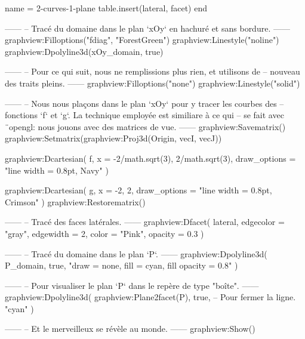 \documentclass{standalone}
\begin{document}
\begin{luadraw}{name = 2-curves-1-plane}
  table.insert(lateral, facet)
end

------
-- Tracé du domaine dans le plan `xOy` en hachuré et sans bordure.
------
graphview:Filloptions("fdiag", "ForestGreen")
graphview:Linestyle("noline")
graphview:Dpolyline3d(xOy_domain, true)

------
-- Pour ce qui suit, nous ne remplissions plus rien, et utilisons de
-- nouveau des traits pleins.
------
graphview:Filloptions("none")
graphview:Linestyle("solid")

------
-- Nous nous plaçons dans le plan `xOy` pour y tracer les courbes des
-- fonctions  `f` et `g`. La technique employée est similiare à ce qui
-- se fait avec ¨opengl: nous jouons avec des matrices de vue.
------
graphview:Savematrix()
  graphview:Setmatrix(graphview:Proj3d({Origin, vecI, vecJ}))

  graphview:Dcartesian(
    f,
    {
      x = {-2/math.sqrt(3), 2/math.sqrt(3)},
      draw_options = "line width = 0.8pt, Navy"
    })

  graphview:Dcartesian(
    g,
    {
      x = {-2, 2},
      draw_options = "line width = 0.8pt, Crimson"
    })
graphview:Restorematrix()

------
-- Tracé des faces latérales.
------
graphview:Dfacet(
  lateral,
  {
    edgecolor = "gray",
    edgewidth = 2,
    color   = "Pink",
    opacity   = 0.3
  })

------
-- Tracé du domaine dans le plan `P`.
------
graphview:Dpolyline3d(
  P_domain,
  true,
  "draw = none, fill = cyan, fill opacity = 0.8"
)

------
-- Pour visualiser le plan `P` dans le repère de type "boîte".
------
graphview:Dpolyline3d(
  graphview:Plane2facet(P),
  true,   -- Pour fermer la ligne.
  "cyan"
)

------
-- Et le merveilleux se révèle au monde.
------
graphview:Show()
\end{luadraw}
\end{document}
